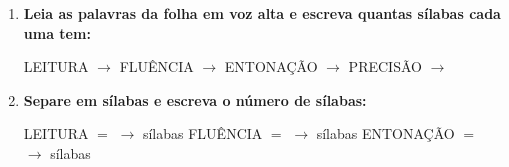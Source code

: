 \begin{exercicio}
\begin{enumerate}[resume]
  \item \textbf{Leia as palavras da folha em voz alta e escreva quantas sílabas cada uma tem:}

  \begin{center}
  LEITURA $\rightarrow$ \underline{\hspace{1cm}} \quad FLUÊNCIA $\rightarrow$ \underline{\hspace{1cm}} \quad ENTONAÇÃO $\rightarrow$ \underline{\hspace{1cm}} \quad PRECISÃO $\rightarrow$ \underline{\hspace{1cm}}
  \end{center}

  \item \textbf{Separe em sílabas e escreva o número de sílabas:}
  \begin{center}
  LEITURA $=$ \underline{\hspace{1.2cm}} $\rightarrow$ \underline{\hspace{0.8cm}} sílabas \quad FLUÊNCIA $=$ \underline{\hspace{1.2cm}} $\rightarrow$ \underline{\hspace{0.8cm}} sílabas \quad ENTONAÇÃO $=$ \underline{\hspace{1.2cm}} $\rightarrow$ \underline{\hspace{0.8cm}} sílabas
  \end{center}

\end{enumerate}

\end{exercicio}




